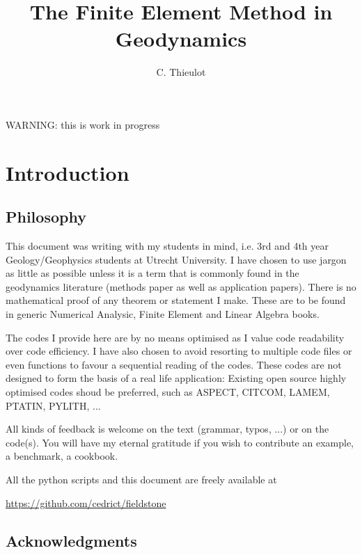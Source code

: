 \documentclass[a4paper]{article}
\title{The Finite Element Method in Geodynamics}
\author{C. Thieulot}
\begin{document}
\maketitle

\tableofcontents

\newpage

\begin{center}
{\color{red} \huge WARNING: this is work in progress}
\end{center}

\section{Introduction}

\subsection{Philosophy} %
This document was writing with my students in mind, i.e. 3rd and 4th year 
Geology/Geophysics students at Utrecht University. 
I have chosen to use jargon as little as possible unless it is a term that is 
commonly found in the geodynamics literature (methods paper as well as 
application papers). There is no mathematical proof of any theorem or statement 
I make. These are to be found in generic Numerical Analysic, Finite Element and 
Linear Algebra books. 

The codes I provide here are by no means optimised as I value code readability 
over code efficiency. I have also chosen to avoid resorting to multiple code 
files or even functions to favour a sequential reading of the codes. 
These codes are not designed to form the basis of a real life application:
Existing open source highly optimised codes shoud be preferred, such as ASPECT, 
CITCOM, LAMEM, PTATIN, PYLITH, ... 

All kinds of feedback is welcome on the text (grammar, typos, ...) or on the 
code(s). You will have my eternal gratitude if you wish to contribute an 
example, a benchmark, a cookbook. 

All the python scripts and this document are freely available at 
\begin{center}
\url{https://github.com/cedrict/fieldstone}
\end{center}

\subsection{Acknowledgments} %
\end{document}
